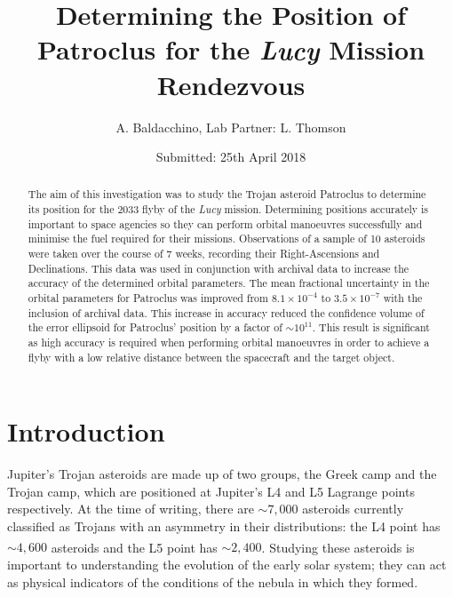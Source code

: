 \documentclass[10pt, twocolumn]{revtex4}    %
\begin{document}
                     

\title{Determining the Position of Patroclus for the \textit{Lucy} Mission Rendezvous} 
\date{Submitted: 25th April 2018}
\author{A. Baldacchino, Lab Partner: L. Thomson}

\begin{abstract}              

The aim of this investigation was to study the Trojan asteroid Patroclus to determine its position for the 2033 flyby of the \textit{Lucy} mission. Determining positions accurately is important to space agencies so they can perform orbital manoeuvres successfully and minimise the fuel required for their missions. Observations of a sample of 10 asteroids were taken over the course of 7 weeks, recording their Right-Ascensions and Declinations. This data was used in conjunction with archival data to increase the accuracy of the determined orbital parameters. The mean fractional uncertainty in the orbital parameters for Patroclus was improved from $8.1 \times 10^{-4}$ to $3.5 \times 10^{-7}$ with the inclusion of archival data. This increase in accuracy reduced the confidence volume of the error ellipsoid for Patroclus' position by a factor of ${\sim}10^{11}$. This result is significant as high accuracy is required when performing orbital manoeuvres in order to achieve a flyby with a low relative distance between the spacecraft and the target object. 

\end{abstract}

\maketitle
\thispagestyle{plain} %

\section{Introduction} 

Jupiter's Trojan asteroids are made up of two groups, the Greek camp and the Trojan camp, which are positioned at Jupiter's L4 and L5 Lagrange points respectively. At the time of writing, there are ${\sim}7{,}000$ asteroids currently classified as Trojans with an asymmetry in their distributions: the L4 point has ${\sim}4{,}600$ asteroids and the L5 point has ${\sim}2{,}400$.\textsuperscript{\cite{ListJupiterTrojans}} Studying these asteroids is important to understanding the evolution of the early solar system; they can act as physical indicators of the conditions of the nebula in which they formed.
\end{document}
